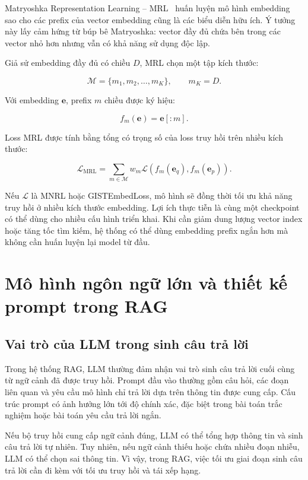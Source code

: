 \documentclass[../DoAn.tex]{subfiles}
\begin{document}
Matryoshka Representation Learning -- MRL~\cite{kusupati2022matryoshka} huấn luyện mô hình embedding sao cho các prefix của vector embedding cũng là các biểu diễn hữu ích. Ý tưởng này lấy cảm hứng từ búp bê Matryoshka: vector đầy đủ chứa bên trong các vector nhỏ hơn nhưng vẫn có khả năng sử dụng độc lập.

Giả sử embedding đầy đủ có chiều $D$, MRL chọn một tập kích thước:

\[
\mathcal{M}=\{m_1,m_2,\ldots,m_K\},
\qquad
m_K = D.
\]

Với embedding $\mathbf{e}$, prefix $m$ chiều được ký hiệu:

\[
f_m(\mathbf{e}) = \mathbf{e}[:m].
\]

Loss MRL được tính bằng tổng có trọng số của loss truy hồi trên nhiều kích thước:

\[
\mathcal{L}_{\mathrm{MRL}}
=
\sum_{m\in\mathcal{M}}
w_m
\mathcal{L}
\left(
f_m(\mathbf{e}_q),
f_m(\mathbf{e}_p)
\right).
\]

Nếu $\mathcal{L}$ là MNRL hoặc GISTEmbedLoss, mô hình sẽ đồng thời tối ưu khả năng truy hồi ở nhiều kích thước embedding. Lợi ích thực tiễn là cùng một checkpoint có thể dùng cho nhiều cấu hình triển khai. Khi cần giảm dung lượng vector index hoặc tăng tốc tìm kiếm, hệ thống có thể dùng embedding prefix ngắn hơn mà không cần huấn luyện lại model từ đầu.

\section{Mô hình ngôn ngữ lớn và thiết kế prompt trong RAG}
\label{section:2.5}

\subsection{Vai trò của LLM trong sinh câu trả lời}
\label{subsection:2.5.1}

Trong hệ thống RAG, LLM thường đảm nhận vai trò sinh câu trả lời cuối cùng từ ngữ cảnh đã được truy hồi. Prompt đầu vào thường gồm câu hỏi, các đoạn liên quan và yêu cầu mô hình chỉ trả lời dựa trên thông tin được cung cấp. Cấu trúc prompt có ảnh hưởng lớn tới độ chính xác, đặc biệt trong bài toán trắc nghiệm hoặc bài toán yêu cầu trả lời ngắn.

Nếu bộ truy hồi cung cấp ngữ cảnh đúng, LLM có thể tổng hợp thông tin và sinh câu trả lời tự nhiên. Tuy nhiên, nếu ngữ cảnh thiếu hoặc chứa nhiều đoạn nhiễu, LLM có thể chọn sai thông tin. Vì vậy, trong RAG, việc tối ưu giai đoạn sinh câu trả lời cần đi kèm với tối ưu truy hồi và tái xếp hạng.
\end{document}
